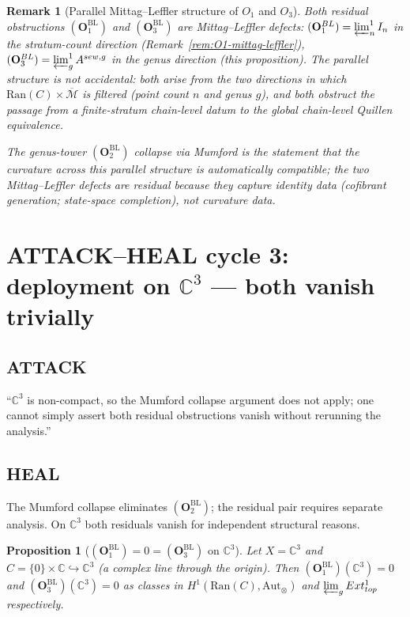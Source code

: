\documentclass[11pt]{amsart}
\newtheorem{proposition}[theorem]{Proposition}
\newtheorem{remark}[theorem]{Remark}
\newcommand{\Ran}{\mathrm{Ran}}
\newcommand{\Mbar}{\overline{\mathcal{M}}}
\newcommand{\bC}{\mathbb{C}}
\newcommand{\Ext}{\mathrm{Ext}}
\newcommand{\Aut}{\mathrm{Aut}}
\begin{document}
\begin{remark}[Parallel Mittag--Leffler structure of $O_1$ and $O_3$]
\label{rem:parallel-ml}
Both residual obstructions $(\mathbf{O}_1^{\mathrm{BL}})$ and
$(\mathbf{O}_3^{\mathrm{BL}})$ are Mittag--Leffler defects:
$(\mathbf{O}_1^{\mathrm{BL}}) = \varprojlim^1_n I_n$ in the
stratum-count direction (Remark~\ref{rem:O1-mittag-leffler}),
$(\mathbf{O}_3^{\mathrm{BL}}) = \varprojlim^1_g A^{\mathrm{sew}, g}$
in the genus direction (this proposition). The parallel structure
is not accidental: both arise from the two directions in which
$\Ran(C) \times \Mbar$ is filtered (point count $n$ and genus $g$),
and both obstruct the passage from a finite-stratum chain-level
datum to the global chain-level Quillen equivalence.

The genus-tower $(\mathbf{O}_2^{\mathrm{BL}})$ collapse via Mumford
is the statement that the \emph{curvature} across this parallel
structure is automatically compatible; the two Mittag--Leffler
defects are residual because they capture \emph{identity} data
(cofibrant generation; state-space completion), not curvature data.
\end{remark}

\section{ATTACK--HEAL cycle 3: deployment on $\bC^3$ --- both vanish
trivially}
\label{sec:cycle-3-C3}

\subsection*{ATTACK}

``$\bC^3$ is non-compact, so the Mumford collapse argument does not
apply; one cannot simply assert both residual obstructions vanish
without rerunning the analysis.''

\subsection*{HEAL}

The Mumford collapse eliminates $(\mathbf{O}_2^{\mathrm{BL}})$; the
residual pair requires separate analysis. On $\bC^3$ both residuals
vanish for independent structural reasons.

\begin{proposition}[$(\mathbf{O}_1^{\mathrm{BL}}) = 0 =
(\mathbf{O}_3^{\mathrm{BL}})$ on $\bC^3$]
\label{prop:C3-both-vanish}
Let $X = \bC^3$ and $C = \{0\} \times \bC \hookrightarrow \bC^3$
(a complex line through the origin). Then
$(\mathbf{O}_1^{\mathrm{BL}})(\bC^3) = 0$ and
$(\mathbf{O}_3^{\mathrm{BL}})(\bC^3) = 0$ as classes in
$H^1(\Ran(C), \Aut_\otimes)$ and
$\varprojlim_g \Ext^1_{\mathrm{top}}$ respectively.
\end{proposition}
\end{document}
